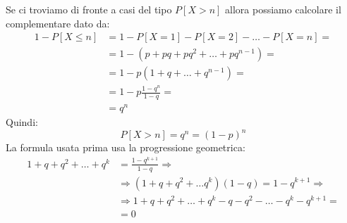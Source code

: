 \documentclass[12pt]{report}
\begin{document}
  	 	Se ci troviamo di fronte a casi del tipo $P[X>n]$ allora possiamo calcolare il complementare dato da:
  	 	\begin{align*}
  	 	1 - P[X\leq n] &= 1 - P[X=1] - P[X=2] - \dots  - P[X=n] = \\&= 1 - (p + pq + pq^2 + \dots + pq^{n-1}) = \\ &= 1 - p(1 + q + \dots + q^{n-1})= \\ &= 1-p\frac{1-q^n}{1-q}=  \\ &= q^n
  	 	\end{align*}
  	 	Quindi:
  	 	\[
  	 	P[X>n] = q^n = (1-p)^n
  	 	\]
  	 	La formula usata prima usa la progressione geometrica:
  	 	\begin{align*}
  	 	1+q+q^2+\dots+q^k &= \frac{1 - q^{k+1}}{1-q} \Rightarrow \\ &\Rightarrow (1+q+q^2 + \dots  q^k)(1-q)=1-q^{k+1} \Rightarrow \\ &\Rightarrow
  	 	1+q+q^2+\dots+q^k-q-q^2-\dots-q^k-q^{k+1}=\\ &= 0
  	 	\end{align*}
\end{document}
